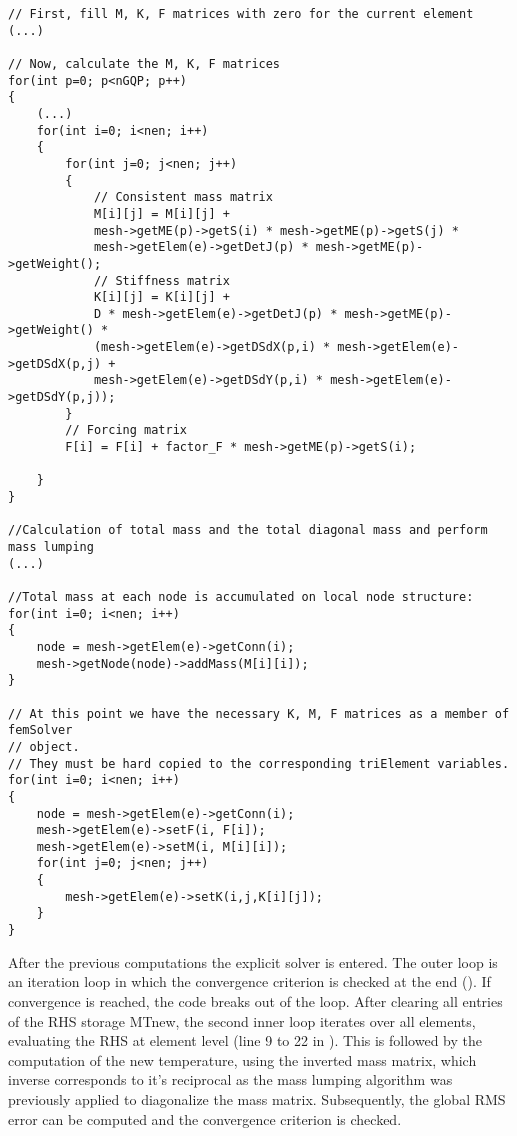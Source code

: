 \begin{lstlisting}[caption={\label{Code:Serial1} Calculation of Element Matrices}]
// First, fill M, K, F matrices with zero for the current element
(...)

// Now, calculate the M, K, F matrices
for(int p=0; p<nGQP; p++)
{   
	(...)
	for(int i=0; i<nen; i++)
	{
		for(int j=0; j<nen; j++)
		{
			// Consistent mass matrix
			M[i][j] = M[i][j] +
			mesh->getME(p)->getS(i) * mesh->getME(p)->getS(j) *
			mesh->getElem(e)->getDetJ(p) * mesh->getME(p)->getWeight();
			// Stiffness matrix
			K[i][j] = K[i][j] +
			D * mesh->getElem(e)->getDetJ(p) * mesh->getME(p)->getWeight() *
			(mesh->getElem(e)->getDSdX(p,i) * mesh->getElem(e)->getDSdX(p,j) +
			mesh->getElem(e)->getDSdY(p,i) * mesh->getElem(e)->getDSdY(p,j));
		}
		// Forcing matrix
		F[i] = F[i] + factor_F * mesh->getME(p)->getS(i);
		
	}
}

//Calculation of total mass and the total diagonal mass and perform mass lumping
(...)

//Total mass at each node is accumulated on local node structure:
for(int i=0; i<nen; i++)
{
	node = mesh->getElem(e)->getConn(i);
	mesh->getNode(node)->addMass(M[i][i]);
}

// At this point we have the necessary K, M, F matrices as a member of femSolver 
// object.
// They must be hard copied to the corresponding triElement variables.
for(int i=0; i<nen; i++)
{
	node = mesh->getElem(e)->getConn(i);
	mesh->getElem(e)->setF(i, F[i]);
	mesh->getElem(e)->setM(i, M[i][i]);
	for(int j=0; j<nen; j++)
	{
		mesh->getElem(e)->setK(i,j,K[i][j]);
	}
}
\end{lstlisting}

After the previous computations the explicit solver is entered. The outer loop is an iteration loop in which the convergence criterion is checked at the end (). If convergence is reached, the code breaks out of the loop. After clearing all entries of the RHS storage MTnew, the second inner loop iterates over all elements, evaluating the RHS at element level (line 9 to 22 in ). This is followed by the computation of the new temperature, using the inverted mass matrix, which inverse corresponds to it's reciprocal as the mass lumping algorithm was previously applied to diagonalize the mass matrix. Subsequently, the global RMS error can be computed and the convergence criterion is checked.


